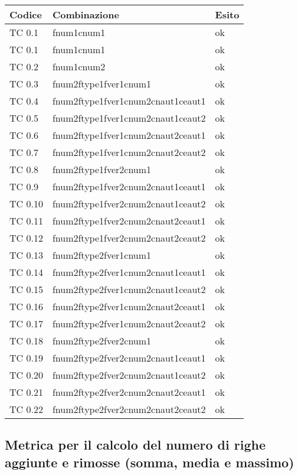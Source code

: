 \vspace{1cm}

\begin{tabular}{|p{3cm}|p{7cm}|p{3cm}|}
	\hline
	\rowcolor{Gray}
	\textbf{Codice} & \textbf{Combinazione} & \textbf{Esito}\tabularnewline
	\hline
	TC 0.1			& fnum1cnum1				& ok \tabularnewline
	\hline
	TC 0.1			& fnum1cnum1				& ok \tabularnewline
	\hline
	TC 0.2			& fnum1cnum2				& ok \tabularnewline
	\hline
	TC 0.3			& fnum2ftype1fver1cnum1			& ok \tabularnewline
	\hline
	TC 0.4			& fnum2ftype1fver1cnum2cnaut1ceaut1	& ok \tabularnewline
	\hline
	TC 0.5			& fnum2ftype1fver1cnum2cnaut1ceaut2	& ok \tabularnewline
	\hline
	TC 0.6			& fnum2ftype1fver1cnum2cnaut2ceaut1	& ok \tabularnewline
	\hline
	TC 0.7			& fnum2ftype1fver1cnum2cnaut2ceaut2	& ok \tabularnewline
	\hline
	TC 0.8			& fnum2ftype1fver2cnum1			& ok \tabularnewline
	\hline
	TC 0.9			& fnum2ftype1fver2cnum2cnaut1ceaut1	& ok \tabularnewline
	\hline
	TC 0.10			& fnum2ftype1fver2cnum2cnaut1ceaut2	& ok \tabularnewline
	\hline
	TC 0.11			& fnum2ftype1fver2cnum2cnaut2ceaut1	& ok \tabularnewline
	\hline
	TC 0.12			& fnum2ftype1fver2cnum2cnaut2ceaut2	& ok \tabularnewline
	\hline
	TC 0.13			& fnum2ftype2fver1cnum1			& ok \tabularnewline
	\hline
	TC 0.14			& fnum2ftype2fver1cnum2cnaut1ceaut1	& ok \tabularnewline
	\hline
	TC 0.15			& fnum2ftype2fver1cnum2cnaut1ceaut2	& ok \tabularnewline
	\hline
	TC 0.16			& fnum2ftype2fver1cnum2cnaut2ceaut1	& ok \tabularnewline
	\hline
	TC 0.17			& fnum2ftype2fver1cnum2cnaut2ceaut2	& ok \tabularnewline
	\hline
	TC 0.18			& fnum2ftype2fver2cnum1			& ok \tabularnewline
	\hline
	TC 0.19			& fnum2ftype2fver2cnum2cnaut1ceaut1	& ok \tabularnewline
	\hline
	TC 0.20			& fnum2ftype2fver2cnum2cnaut1ceaut2	& ok \tabularnewline
	\hline
	TC 0.21			& fnum2ftype2fver2cnum2cnaut2ceaut1	& ok \tabularnewline
	\hline
	TC 0.22			& fnum2ftype2fver2cnum2cnaut2ceaut2	& ok \tabularnewline
	\hline
\end{tabular}
\clearpage




\subsection{Metrica per il calcolo del numero di righe aggiunte e rimosse (somma, media e massimo)}

